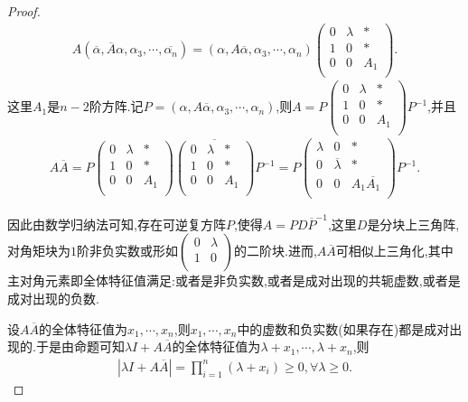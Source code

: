 \documentclass[../../main.tex]{subfiles}
\begin{document}
\begin{proof}
\begin{align*}
A\left( \overline{\alpha },\overline{A}\alpha ,\alpha _3,\cdots ,\overline{\alpha _n} \right) =\left( \alpha ,A\overline{\alpha },\alpha _3,\cdots ,\alpha _n \right) \begin{pmatrix}
0&		\lambda&		*\\
1&		0&		*\\
0&		0&		A_1\\
\end{pmatrix}.
\end{align*}
这里$A_1$是$n-2$阶方阵.记$P=\left( \alpha ,A\overline{\alpha },\alpha _3,\cdots ,\alpha _n \right)$,则$A=P\begin{pmatrix}
0&		\lambda&		*\\
1&		0&		*\\
0&		0&		A_1\\
\end{pmatrix} P^{-1}$,并且
\begin{align*}
A\overline{A}=P\begin{pmatrix}
0&		\lambda&		*\\
1&		0&		*\\
0&		0&		A_1\\
\end{pmatrix} \overline{\begin{pmatrix}
0&		\lambda&		*\\
1&		0&		*\\
0&		0&		A_1\\
\end{pmatrix} }P^{-1}=P\begin{pmatrix}
\lambda&		0&		*\\
0&		\overline{\lambda }&		*\\
0&		0&		A_1\overline{A_1}\\
\end{pmatrix} P^{-1}.
\end{align*}

因此由数学归纳法可知,存在可逆复方阵$P$,使得$A=PD\overline{P}^{-1}$,这里$D$是分块上三角阵,对角矩块为$1$阶非负实数或形如$\begin{pmatrix}
0&		\lambda\\
1&		0\\
\end{pmatrix}$的二阶块.进而,$A\overline{A}$可相似上三角化,其中主对角元素即全体特征值满足:或者是非负实数,或者是成对出现的共轭虚数,或者是成对出现的负数.

设$A\overline{A}$的全体特征值为$x_1,\cdots ,x_n$,则$x_1,\cdots ,x_n$中的虚数和负实数(如果存在)都是成对出现的.于是由命题可知$\lambda I+A\overline{A}$的全体特征值为$\lambda +x_1,\cdots ,\lambda +x_n$,则
\begin{align*}
\left| \lambda I+A\overline{A} \right|=\prod_{i=1}^n{\left( \lambda +x_i \right)}\geqslant 0,\forall \lambda \geqslant 0.
\end{align*}

\end{proof}
\end{document}
